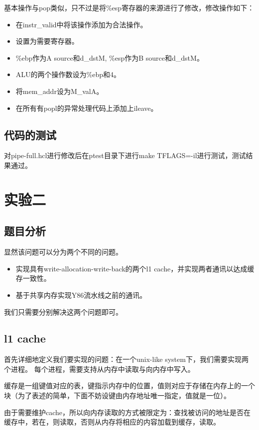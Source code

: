 \documentclass{article}
\theoremstyle{plain} \newtheorem{theorem}{常识}[section]
\theoremstyle{plain} \newtheorem{lizi}{例}[section]
\begin{document}
基本操作与pop类似，只不过是将\%esp寄存器的来源进行了修改，修改操作如下：

\begin{itemize}
    \item 在instr\_valid中将该操作添加为合法操作。
    \item 设置为需要寄存器。
    \item \%ebp作为A source和d\_dstM, \%esp作为B source和d\_dstM。
    \item ALU的两个操作数设为\%ebp和4。
    \item 将mem\_addr设为M\_valA。
    \item 在所有有popl的异常处理代码上添加上ileave。
\end{itemize}

\subsection{代码的测试}
对pipe-full.hcl进行修改后在ptest目录下进行make TFLAGS=-il进行测试，测试结果通过。

\section{实验二}
\subsection{题目分析}
显然该问题可以分为两个不同的问题。

\begin{itemize}
    \item 实现具有write-allocation-write-back的两个l1 cache，并实现两者通讯以达成缓存一致性。
    \item 基于共享内存实现Y86流水线之前的通讯。
\end{itemize}

我们只需要分别解决这两个问题即可。

\subsection{l1 cache}
首先详细地定义我们要实现的问题：在一个unix-like system下，我们需要实现两个进程。
每个进程，需要支持从内存中读取与向内存中写入。

缓存是一组键值对应的表，键指示内存中的位置，值则对应于存储在内存上的一个块（为了表述的简单，下面不妨设键由内存地址唯一指定，值就是一位）。

由于需要维护cache，所以向内存读取的方式被限定为：查找被访问的地址是否在缓存中，若在，则读取，否则从内存将相应的内容加载到缓存，读取。
\end{document}
